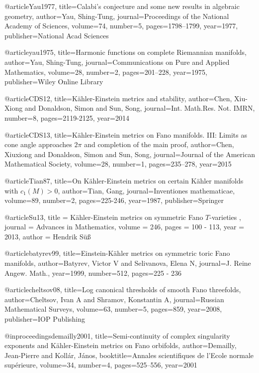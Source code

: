 @article{Yau1977,
  title={Calabi's conjecture and some new results in algebraic geometry},
  author={Yau, Shing-Tung},
  journal={Proceedings of the National Academy of Sciences},
  volume={74},
  number={5},
  pages={1798--1799},
  year={1977},
  publisher={National Acad Sciences}
}

@article{yau1975,
  title={Harmonic functions on complete Riemannian manifolds},
  author={Yau, Shing-Tung},
  journal={Communications on Pure and Applied Mathematics},
  volume={28},
  number={2},
  pages={201--228},
  year={1975},
  publisher={Wiley Online Library}
}


@article{CDS12,
  title={K{\"a}hler-{E}instein metrics and stability},
  author={Chen, Xiu-Xiong and Donaldson, Simon and Sun, Song},
  journal={Int. Math.Res. Not. IMRN},
  number={8},
  pages={2119-2125},
  year={2014}
}

@article{CDS13,
  title={K{\"a}hler-{E}instein metrics on {F}ano manifolds. {I}{I}{I}: {L}imits as cone angle approaches $2 \pi$ and completion of the main proof},
  author={Chen, Xiuxiong and Donaldson, Simon and Sun, Song},
  journal={Journal of the American Mathematical Society},
  volume={28},
  number={1},
  pages={235--278},
  year={2015}
}

@article{Tian87,
  title={On {K}{\"a}hler-{E}instein metrics on certain {K}{\"a}hler manifolds with $c_1 (M)> 0$},
  author={Tian, Gang},
  journal={Inventiones mathematicae},
  volume={89},
  number={2},
  pages={225-246},
  year={1987},
  publisher={Springer}
}

@article{Su13,
title = {{K}{\"a}hler-{E}instein metrics on symmetric {Fano} {$T$-varieties} },
journal = {Advances in Mathematics},
volume = {246},
pages = {100 - 113},
year = {2013},
author = {Hendrik S{\"u}{\ss}}
}

@article{batyrev99,
  title={Einstein-{K}{\"a}hler metrics on symmetric toric {F}ano manifolds},
  author={Batyrev, Victor V and Selivanova, Elena N},
  journal={{J}. {R}eine {A}ngew. {M}ath.},
  year={1999},
  number={512},
  pages={225 - 236}
}

@article{cheltsov08,
  title={Log canonical thresholds of smooth {F}ano threefolds},
  author={Cheltsov, Ivan A and Shramov, Konstantin A},
  journal={Russian Mathematical Surveys},
  volume={63},
  number={5},
  pages={859},
  year={2008},
  publisher={IOP Publishing}
}

@inproceedings{demailly2001,
  title={Semi-continuity of complex singularity exponents and {K}{\"a}hler-{E}instein metrics on {F}ano orbifolds},
  author={Demailly, Jean-Pierre and Koll{\'a}r, J{\'a}nos},
  booktitle={Annales scientifiques de l'Ecole normale sup{\'e}rieure},
  volume={34},
  number={4},
  pages={525--556},
  year={2001}
}



